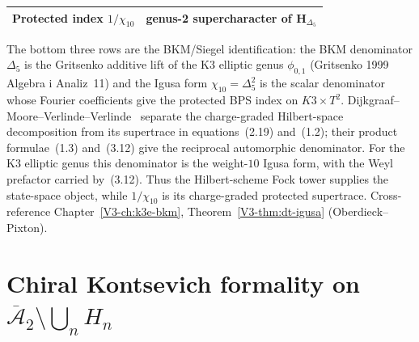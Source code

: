 \begin{remark}
\begin{center}
\begin{tabular}{ll}
Protected index $1/\chi_{10}$ & genus-2 supercharacter of $\mathbf{H}_{\Delta_5}$ \\
\bottomrule
\end{tabular}
\end{center}
The bottom three rows are the BKM/Siegel identification: the BKM
denominator $\Delta_5$ is the Gritsenko additive lift of the K3 elliptic
genus $\phi_{0,1}$ (Gritsenko 1999 \textup{Algebra i Analiz}~11) and the
Igusa form $\chi_{10}=\Delta_5^2$ is the scalar denominator whose
Fourier coefficients give the protected BPS index on $K3\times T^2$.
Dijkgraaf--Moore--Verlinde--Verlinde~\cite{DijkgraafMooreVerlindeVerlinde1997}
separate the charge-graded Hilbert-space decomposition from its
supertrace in equations~\textup{(}2.19\textup{)} and~\textup{(}1.2\textup{)};
their product formulae~\textup{(}1.3\textup{)} and~\textup{(}3.12\textup{)}
give the reciprocal automorphic denominator.  For the K3 elliptic
genus this denominator is the weight-$10$ Igusa form, with the Weyl
prefactor carried by~\textup{(}3.12\textup{)}.  Thus the Hilbert-scheme
Fock tower supplies the state-space object, while $1/\chi_{10}$ is
its charge-graded protected supertrace.
Cross-reference Chapter~\ref{V3-ch:k3e-bkm},
Theorem~\textup{\ref{V3-thm:dt-igusa}} (Oberdieck--Pixton).
\end{remark}



\section{Chiral Kontsevich formality on
\texorpdfstring{$\overline{\mathcal A}_2\setminus\bigcup_n H_n$}{A2bar minus
Humbert union}}
\label{sec:chiral-kontsevich-formality}

